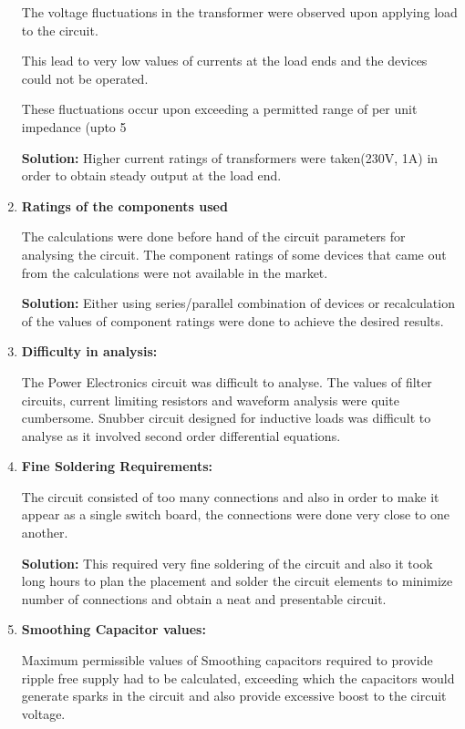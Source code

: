 \begin{enumerate}
			The voltage fluctuations in the transformer were observed upon applying load to the circuit.
			
			This lead to very low values of currents at the load ends and the devices could not be operated.
			
			These fluctuations occur upon exceeding a permitted range of per unit impedance (upto 5%
			
			\textbf{Solution:} Higher current ratings of transformers were taken(230V, 1A) in order to obtain steady output at the load end.
			
			\item \textbf{Ratings of the components used}
			
			The calculations were done before hand of the circuit parameters for analysing the circuit. The component ratings of some devices that came out from the calculations were not available in the market.
			
			\textbf{Solution:} Either using series/parallel combination of devices or recalculation of the values of component ratings were done to achieve the desired results.
			
			\item \textbf{Difficulty in analysis:}
			
			The Power Electronics circuit was difficult to analyse. The values of  filter circuits, current limiting resistors and waveform analysis were quite cumbersome. Snubber circuit designed for inductive loads was difficult to analyse as it involved second order differential equations.
			
			\item \textbf{Fine Soldering Requirements:}
			
			The circuit consisted of too many connections and also in order to make it appear as a single switch board, the connections were done very close to one another.
			
			\textbf{Solution:} This required very fine soldering of the circuit and also it took long hours to plan the placement and solder the circuit elements to minimize number of connections and obtain a neat and presentable circuit.
			
			\item \textbf{Smoothing Capacitor values:}
			
			Maximum permissible values of Smoothing capacitors required to provide ripple free supply had to be calculated, exceeding which the capacitors would generate sparks in the circuit and also provide excessive boost to the circuit voltage.
			

\end{enumerate}
